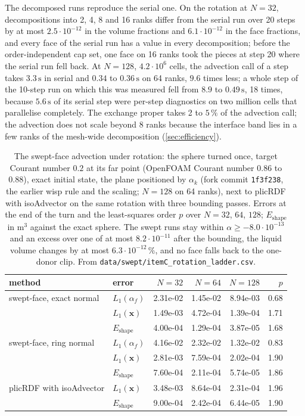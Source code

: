 \documentclass[preprint,12pt]{elsarticle}
\begin{document}
The decomposed runs reproduce the serial one. On the rotation at $N = 32$, decompositions into 2, 4, 8 and 16 ranks differ from the serial run over 20 steps by at most $2.5\cdot10^{-12}$ in the volume fractions and $6.1\cdot10^{-12}$ in the face fractions, and every face of the serial run has a value in every decomposition; before the order-independent cap set, one face on 16 ranks took the pieces at step 20 where the serial run fell back. At $N = 128$, $4.2\cdot10^6$ cells, the advection call of a step takes $3.3\,\mathrm{s}$ in serial and $0.34$ to $0.36\,\mathrm{s}$ on 64 ranks, $9.6$ times less; a whole step of the 10-step run on which this was measured fell from $8.9$ to $0.49\,\mathrm{s}$, 18 times, because $5.6\,\mathrm{s}$ of its serial step were per-step diagnostics on two million cells that parallelise completely. The exchange proper takes 2 to $5\,\%$ of the advection call; the advection does not scale beyond 8 ranks because the interface band lies in a few ranks of the mesh-wide decomposition (\cref{sec:efficiency}).

\begin{table}[htbp]
\centering
\caption{The swept-face advection under rotation: the sphere turned once, target Courant number $0.2$ at its far point (OpenFOAM Courant number $0.86$ to $0.88$), exact initial state, the plane positioned by $\alpha_k$ (fork commit \texttt{1f3f238}, the earlier wisp rule and the scaling; $N = 128$ on 64 ranks), next to plicRDF with isoAdvector on the same rotation with three bounding passes. Errors at the end of the turn and the least-squares order $p$ over $N = 32$, $64$, $128$; $E_{\mathrm{shape}}$ in $\mathrm{m^3}$ against the exact sphere. The swept runs stay within $\alpha \ge -8.0\cdot10^{-13}$ and an excess over one of at most $8.2\cdot10^{-11}$ after the bounding, the liquid volume changes by at most $6.3\cdot10^{-12}\,\%$, and no face falls back to the one-donor clip. From \texttt{data/swept/itemC\_rotation\_ladder.csv}.}
\label{tab:swept-rotation}
\footnotesize
\begin{tabular}{llrrrr}
\toprule
method & error & $N = 32$ & $N = 64$ & $N = 128$ & $p$ \\
\midrule
swept-face, exact normal & $L_1(\alpha_f)$ & 2.31e-02 & 1.45e-02 & 8.94e-03 & 0.68 \\
 & $L_1(\mathbf{x})$ & 1.49e-03 & 4.72e-04 & 1.39e-04 & 1.71 \\
 & $E_{\mathrm{shape}}$ & 4.00e-04 & 1.29e-04 & 3.87e-05 & 1.68 \\
swept-face, ring normal & $L_1(\alpha_f)$ & 4.16e-02 & 2.32e-02 & 1.32e-02 & 0.83 \\
 & $L_1(\mathbf{x})$ & 2.81e-03 & 7.59e-04 & 2.02e-04 & 1.90 \\
 & $E_{\mathrm{shape}}$ & 7.60e-04 & 2.11e-04 & 5.74e-05 & 1.86 \\
plicRDF with isoAdvector & $L_1(\mathbf{x})$ & 3.48e-03 & 8.64e-04 & 2.31e-04 & 1.96 \\
 & $E_{\mathrm{shape}}$ & 9.00e-04 & 2.42e-04 & 6.44e-05 & 1.90 \\
\bottomrule
\end{tabular}
\end{table}
\end{document}
